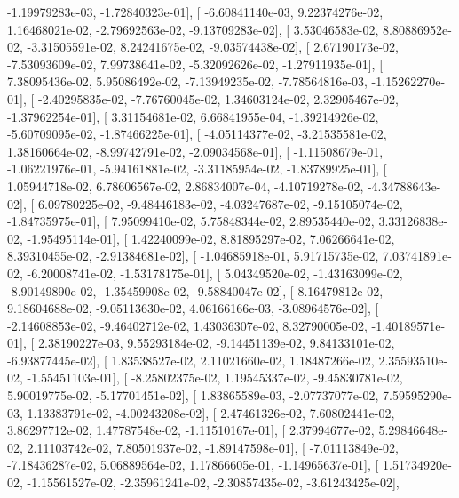 \documentclass{article}
\begin{document}
         -1.19979283e-03,  -1.72840323e-01],
       [ -6.60841140e-03,   9.22374276e-02,   1.16468021e-02,
         -2.79692563e-02,  -9.13709283e-02],
       [  3.53046583e-02,   8.80886952e-02,  -3.31505591e-02,
          8.24241675e-02,  -9.03574438e-02],
       [  2.67190173e-02,  -7.53093609e-02,   7.99738641e-02,
         -5.32092626e-02,  -1.27911935e-01],
       [  7.38095436e-02,   5.95086492e-02,  -7.13949235e-02,
         -7.78564816e-03,  -1.15262270e-01],
       [ -2.40295835e-02,  -7.76760045e-02,   1.34603124e-02,
          2.32905467e-02,  -1.37962254e-01],
       [  3.31154681e-02,   6.66841955e-04,  -1.39214926e-02,
         -5.60709095e-02,  -1.87466225e-01],
       [ -4.05114377e-02,  -3.21535581e-02,   1.38160664e-02,
         -8.99742791e-02,  -2.09034568e-01],
       [ -1.11508679e-01,  -1.06221976e-01,  -5.94161881e-02,
         -3.31185954e-02,  -1.83789925e-01],
       [  1.05944718e-02,   6.78606567e-02,   2.86834007e-04,
         -4.10719278e-02,  -4.34788643e-02],
       [  6.09780225e-02,  -9.48446183e-02,  -4.03247687e-02,
         -9.15105074e-02,  -1.84735975e-01],
       [  7.95099410e-02,   5.75848344e-02,   2.89535440e-02,
          3.33126838e-02,  -1.95495114e-01],
       [  1.42240099e-02,   8.81895297e-02,   7.06266641e-02,
          8.39310455e-02,  -2.91384681e-02],
       [ -1.04685918e-01,   5.91715735e-02,   7.03741891e-02,
         -6.20008741e-02,  -1.53178175e-01],
       [  5.04349520e-02,  -1.43163099e-02,  -8.90149890e-02,
         -1.35459908e-02,  -9.58840047e-02],
       [  8.16479812e-02,   9.18604688e-02,  -9.05113630e-02,
          4.06166166e-03,  -3.08964576e-02],
       [ -2.14608853e-02,  -9.46402712e-02,   1.43036307e-02,
          8.32790005e-02,  -1.40189571e-01],
       [  2.38190227e-03,   9.55293184e-02,  -9.14451139e-02,
          9.84133101e-02,  -6.93877445e-02],
       [  1.83538527e-02,   2.11021660e-02,   1.18487266e-02,
          2.35593510e-02,  -1.55451103e-01],
       [ -8.25802375e-02,   1.19545337e-02,  -9.45830781e-02,
          5.90019775e-02,  -5.17701451e-02],
       [  1.83865589e-03,  -2.07737077e-02,   7.59595290e-03,
          1.13383791e-02,  -4.00243208e-02],
       [  2.47461326e-02,   7.60802441e-02,   3.86297712e-02,
          1.47787548e-02,  -1.11510167e-01],
       [  2.37994677e-02,   5.29846648e-02,   2.11103742e-02,
          7.80501937e-02,  -1.89147598e-01],
       [ -7.01113849e-02,  -7.18436287e-02,   5.06889564e-02,
          1.17866605e-01,  -1.14965637e-01],
       [  1.51734920e-02,  -1.15561527e-02,  -2.35961241e-02,
         -2.30857435e-02,  -3.61243425e-02],
\end{document}
